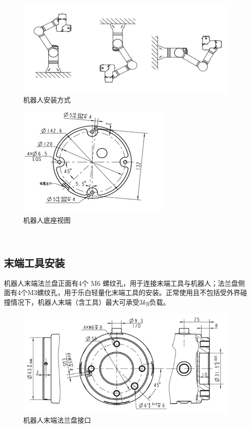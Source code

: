 \begin{figure}[ht]
    \centering
    \includegraphics[width=\textwidth]{image/1-4-direction.jpg}
    \caption{机器人安装方式}
    \label{fig:机器人安装方式}
\end{figure}

 
\begin{figure}[ht]
    \centering
    \includegraphics{image/1-5-base.png}
    \caption{机器人底座视图}
    \label{fig:机器人底座视图}
\end{figure}





 

 
 
\subsection{末端工具安装}

机器人末端法兰盘正面有4个 M6 螺纹孔，用于连接末端工具与机器人；法兰盘侧面有4个M3螺纹孔，用于乐白轻量化末端工具的安装。正常使用且不包括受外界碰撞情况下，机器人末端（含工具）最大可承受$3\unit{kg}$负载。



\begin{figure}[ht]
    \centering
    \includegraphics[width=\textwidth]{image/1-6-flange.png}
    \caption{机器人末端法兰盘接口}
    \label{fig:机器人末端法兰盘接口}
\end{figure}

